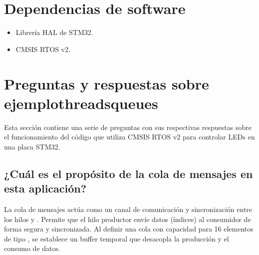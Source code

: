 \documentclass[letterpaper,10pt,english]{sphinxmanual}
\begin{document}
\begin{sphinxVerbatim}[commandchars=\\\{\}]

\end{sphinxVerbatim}


\section{Dependencias de software}
\label{\detokenize{ejemplothreads-queues:dependencias-de-software}}\begin{itemize}
\item {} 
\sphinxAtStartPar
Librería HAL de STM32.

\item {} 
\sphinxAtStartPar
CMSIS RTOS v2.

\end{itemize}


\section{Preguntas y respuestas sobre ejemplothreads\sphinxhyphen{}queues}
\label{\detokenize{ejemplothreads-queues:preguntas-y-respuestas-sobre-ejemplothreads-queues}}
\sphinxAtStartPar
Esta sección contiene una serie de preguntas con sus respectivas respuestas sobre el funcionamiento del código que utiliza CMSIS RTOS v2 para controlar LEDs en una placa STM32.


\subsection{¿Cuál es el propósito de la cola de mensajes  en esta aplicación?}
\label{\detokenize{ejemplothreads-queues:cual-es-el-proposito-de-la-cola-de-mensajes-id-msgqueue-en-esta-aplicacion}}
\sphinxAtStartPar
La cola de mensajes  actúa como un canal de comunicación y sincronización entre los hilos  y . Permite que el hilo productor envíe datos (índices) al consumidor de forma segura y sincronizada. Al definir una cola con capacidad para 16 elementos de tipo , se establece un buffer temporal que desacopla la producción y el consumo de datos.
\end{document}
